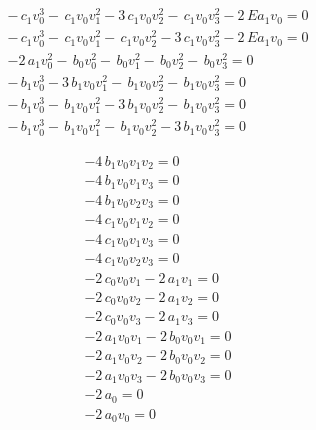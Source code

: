 \documentclass[11pt]{beamer}
\begin{document}
\begin{frame}
\begin{minipage}{.7\linewidth}
\begin{equation*}
\begin{array}{r}
- \, c_{1} v_{0}^{3} -  \, c_{1} v_{0} v_{1}^{2} - 3 \, c_{1} v_{0} v_{2}^{2} -  \, c_{1} v_{0} v_{3}^{2} - 2 \, E a_{1} v_{0} =0\\
- \, c_{1} v_{0}^{3} -  \, c_{1} v_{0} v_{1}^{2} -  \, c_{1} v_{0} v_{2}^{2} - 3 \, c_{1} v_{0} v_{3}^{2} - 2 \, E a_{1} v_{0} =0\\
-2 \, a_{1} v_{0}^{2} -  \, b_{0} v_{0}^{2} -  \, b_{0} v_{1}^{2} -  \, b_{0} v_{2}^{2} -  \, b_{0} v_{3}^{2} =0\\
- \, b_{1} v_{0}^{3} - 3 \, b_{1} v_{0} v_{1}^{2} -  \, b_{1} v_{0} v_{2}^{2} -  \, b_{1} v_{0} v_{3}^{2} =0\\
- \, b_{1} v_{0}^{3} -  \, b_{1} v_{0} v_{1}^{2} - 3 \, b_{1} v_{0} v_{2}^{2} -  \, b_{1} v_{0} v_{3}^{2} =0\\
- \, b_{1} v_{0}^{3} -  \, b_{1} v_{0} v_{1}^{2} -  \, b_{1} v_{0} v_{2}^{2} - 3 \, b_{1} v_{0} v_{3}^{2} =0
\end{array}
\end{equation*}
\end{minipage}%
\begin{minipage}{.3\linewidth}
\begin{equation*}
\begin{array}{r}
-4 \, b_{1} v_{0} v_{1} v_{2} =0\\
-4 \, b_{1} v_{0} v_{1} v_{3} =0\\
-4 \, b_{1} v_{0} v_{2} v_{3} =0\\
-4 \, c_{1} v_{0} v_{1} v_{2} =0\\
-4 \, c_{1} v_{0} v_{1} v_{3} =0\\
-4 \, c_{1} v_{0} v_{2} v_{3} =0\\
-2 \, c_{0} v_{0} v_{1} - 2 \, a_{1} v_{1} =0\\
-2 \, c_{0} v_{0} v_{2} - 2 \, a_{1} v_{2} =0\\
-2 \, c_{0} v_{0} v_{3} - 2 \, a_{1} v_{3} =0\\
-2 \, a_{1} v_{0} v_{1} - 2 \, b_{0} v_{0} v_{1} =0\\
-2 \, a_{1} v_{0} v_{2} - 2 \, b_{0} v_{0} v_{2} =0\\
-2 \, a_{1} v_{0} v_{3} - 2 \, b_{0} v_{0} v_{3} =0\\
-2 \, a_{0} =0\\
-2 \, a_{0} v_{0} =0\\
\end{array}
\end{equation*}
\end{minipage}
\end{frame}
\end{document}
